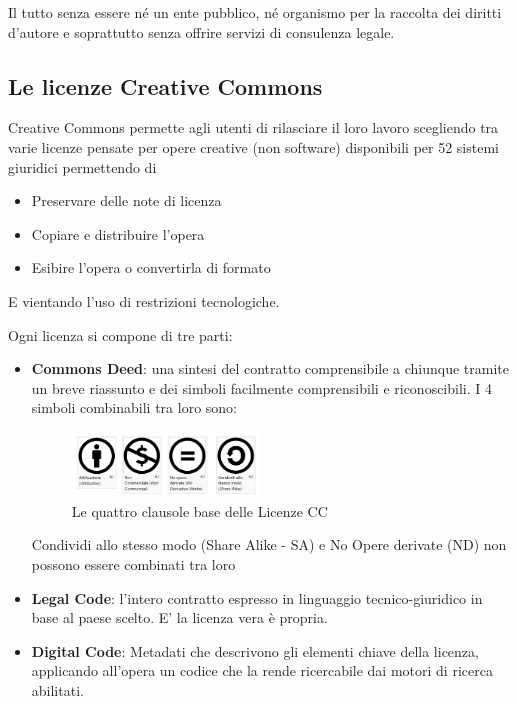 Il tutto senza essere né un ente pubblico, né organismo per la raccolta dei diritti d'autore e soprattutto senza offrire servizi di consulenza legale.

\subsection{Le licenze Creative Commons}

Creative Commons permette agli utenti di rilasciare il loro lavoro scegliendo tra varie licenze pensate per opere creative (non software) disponibili per 52 sistemi giuridici permettendo di 

\begin{itemize}
\item Preservare delle note di licenza
\item Copiare e distribuire l'opera
\item Esibire l'opera o convertirla di formato
\end{itemize}

E vientando l'uso di restrizioni tecnologiche.

Ogni licenza si compone di tre parti:
\begin{itemize}
\item \textbf{Commons Deed}: una sintesi del contratto comprensibile a chiunque tramite un breve riassunto e dei simboli facilmente comprensibili e riconoscibili. I 4 simboli combinabili tra loro sono:

\begin{figure}[htbp]
\centering
\includegraphics[width=50mm]{images/CC_Deed}
\caption{Le quattro clausole base delle Licenze CC}
\end{figure}

Condividi allo stesso modo (Share Alike - SA) e No Opere derivate (ND) non possono essere combinati tra loro

\item \textbf{Legal Code}: l’intero contratto espresso in linguaggio tecnico-giuridico in base al paese scelto. E' la licenza vera è propria.
\item \textbf{Digital Code}: Metadati che descrivono gli elementi chiave della licenza, applicando all'opera un codice che la rende ricercabile dai motori di ricerca abilitati.
\end{itemize}

